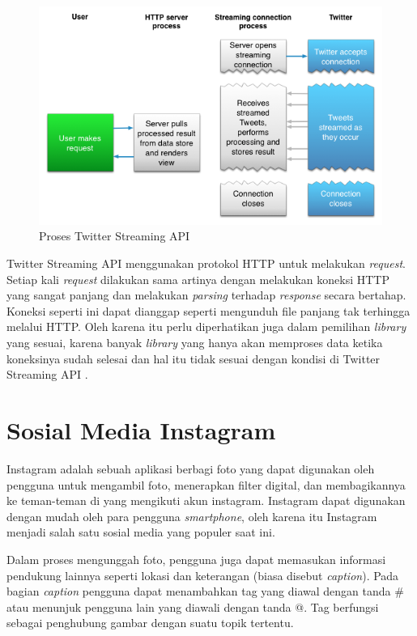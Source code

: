 \begin{figure}
\centering
\includegraphics[scale=0.5]{Gambar/streaming-intro-2_1.png}
\caption[Proses Twitter Streaming API]{Proses Twitter Streaming API \cite{TwitterApi:2015}} 
\end{figure}

Twitter Streaming API menggunakan protokol HTTP untuk melakukan \textit{request}. Setiap kali \textit{request} dilakukan sama artinya dengan melakukan koneksi HTTP yang sangat panjang dan melakukan \textit{parsing} terhadap \textit{response} secara bertahap. Koneksi seperti ini dapat dianggap seperti mengunduh file panjang tak terhingga melalui HTTP. Oleh karena itu perlu diperhatikan juga dalam pemilihan \textit{library} yang sesuai, karena banyak \textit{library} yang hanya akan memproses data ketika koneksinya sudah selesai dan hal itu tidak sesuai dengan kondisi di Twitter Streaming API \cite{TwitterApi:2015}.

\section{Sosial Media Instagram}
Instagram adalah sebuah aplikasi berbagi foto yang dapat digunakan oleh pengguna untuk mengambil foto, menerapkan filter digital, dan membagikannya ke teman-teman di yang mengikuti akun instagram. Instagram dapat digunakan dengan mudah oleh para pengguna \textit{smartphone}, oleh karena itu Instagram menjadi salah satu sosial media yang populer saat ini. 

Dalam proses mengunggah foto, pengguna juga dapat memasukan informasi pendukung lainnya seperti lokasi dan keterangan (biasa disebut \textit{caption}). Pada bagian \textit{caption} pengguna dapat menambahkan tag yang diawal dengan tanda \# atau menunjuk pengguna lain yang diawali dengan tanda @. Tag berfungsi sebagai penghubung gambar dengan suatu topik tertentu. 

